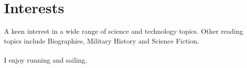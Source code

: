 
\section{Interests}

A keen interest in a wide range of science and technology topics. 
Other reading topics include Biographies, Military History 
and Science Fiction. \\~\\
I enjoy running and sailing. 

\closesection{}
